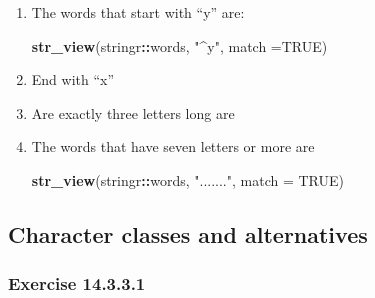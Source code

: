 \documentclass[]{book}
\newenvironment{Shaded}{\begin{snugshade}}{\end{snugshade}}
\newcommand{\DataTypeTok}[1]{\textcolor[rgb]{0.13,0.29,0.53}{#1}}
\newcommand{\KeywordTok}[1]{\textcolor[rgb]{0.13,0.29,0.53}{\textbf{#1}}}
\newcommand{\NormalTok}[1]{#1}
\newcommand{\OperatorTok}[1]{\textcolor[rgb]{0.81,0.36,0.00}{\textbf{#1}}}
\newcommand{\OtherTok}[1]{\textcolor[rgb]{0.56,0.35,0.01}{#1}}
\newcommand{\StringTok}[1]{\textcolor[rgb]{0.31,0.60,0.02}{#1}}
\theoremstyle{plain}
\theoremstyle{remark}
\theoremstyle{definition}
\theoremstyle{definition}
\theoremstyle{definition}
\theoremstyle{remark}
\begin{document}
\begin{enumerate}
\def\labelenumi{\arabic{enumi}.}
\item
  The words that start with ``y'' are:

\begin{Shaded}
\begin{Highlighting}[]
\KeywordTok{str_view}\NormalTok{(stringr}\OperatorTok{::}\NormalTok{words, }\StringTok{"^y"}\NormalTok{, }\DataTypeTok{match =}\OtherTok{TRUE}\NormalTok{)}
\end{Highlighting}
\end{Shaded}
\item
  End with ``x''

\begin{Shaded}
\end{Shaded}
\item
  Are exactly three letters long are

\begin{Shaded}
\end{Shaded}
\item
  The words that have seven letters or more are

\begin{Shaded}
\begin{Highlighting}[]
\KeywordTok{str_view}\NormalTok{(stringr}\OperatorTok{::}\NormalTok{words, }\StringTok{"......."}\NormalTok{, }\DataTypeTok{match =} \OtherTok{TRUE}\NormalTok{)}
\end{Highlighting}
\end{Shaded}
\end{enumerate}

\hypertarget{character-classes-and-alternatives}{%
\subsection{Character classes and
alternatives}\label{character-classes-and-alternatives}}

\hypertarget{exercise-14.3.3.1}{%
\subsubsection*{\texorpdfstring{Exercise
{14.3.3.1}}{Exercise 14.3.3.1}}\label{exercise-14.3.3.1}}
\end{document}
